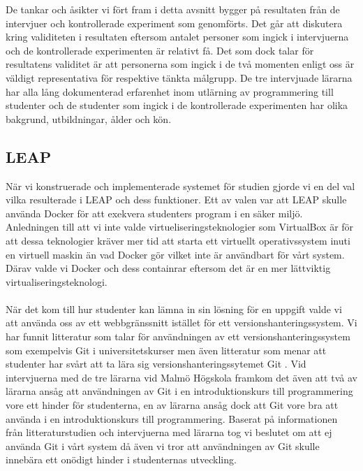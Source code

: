 \documentclass[a4paper,11pt]{article}
\begin{document}
{De tankar och åsikter vi fört fram i detta avsnitt bygger på resultaten från de intervjuer och kontrollerade experiment som genomförts. Det går att diskutera kring validiteten i resultaten eftersom antalet personer som ingick i intervjuerna och de kontrollerade experimenten är relativt få. Det som dock talar för resultatens validitet är att personerna som ingick i de två momenten enligt oss är väldigt representativa för respektive tänkta målgrupp. De tre intervjuade lärarna har alla lång dokumenterad erfarenhet inom utlärning av programmering till studenter och de studenter som ingick i de kontrollerade experimenten har olika bakgrund, utbildningar, ålder och kön.

\subsection{LEAP}

När vi konstruerade och implementerade systemet för studien gjorde vi en del val vilka resulterade i LEAP och dess funktioner. Ett av valen var att LEAP skulle använda Docker för att exekvera studenters program i en säker miljö. Anledningen till att vi inte valde virtueliseringsteknologier som VirtualBox är för att dessa teknologier kräver mer tid att starta ett virtuellt operativssystem inuti en virtuell maskin än vad Docker gör \cite{stastna_security_2015} vilket inte är användbart för vårt system. Därav valde vi Docker och dess containrar eftersom det är en mer lättviktig virtualiseringsteknologi.
\\
\\
När det kom till hur studenter kan lämna in sin lösning för en uppgift valde vi att använda oss av ett webbgränssnitt istället för ett versionshanteringssystem. Vi har funnit litteratur som talar för användningen av ett versionshanteringssystem som exempelvis Git i universitetskurser \cite{ermolayev} \cite{kelleher} men även litteratur som menar att studenter har svårt att ta lära sig versionshanteringssytemet Git \cite{haaranen}. Vid intervjuerna med de tre lärarna vid Malmö Högskola framkom det även att två av lärarna ansåg att användningen av Git i en introduktionskurs till programmering vore ett hinder för studenterna, en av lärarna ansåg dock att Git vore bra att använda i en introduktionskurs till programmering. Baserat på informationen från litteraturstudien och intervjuerna med lärarna tog vi beslutet om att ej använda Git i vårt system då även vi tror att användningen av Git skulle innebära ett onödigt hinder i studenternas utveckling.

}
\end{document}
